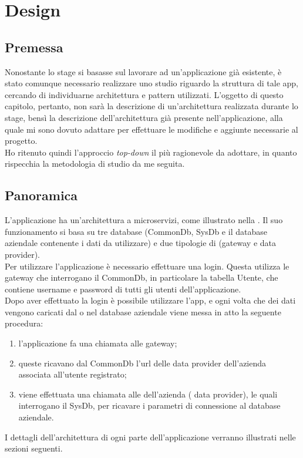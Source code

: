 \chapter{Design}
\label{cap:design}


\section{Premessa}

Nonostante lo stage si basasse sul lavorare ad un'applicazione già esistente, è stato comunque necessario realizzare uno studio riguardo la struttura di tale app, cercando di individuarne architettura e pattern utilizzati. L'oggetto di questo capitolo, pertanto, non sarà la descrizione di un'architettura realizzata durante lo stage, bensì la descrizione dell'architettura già presente nell'applicazione, alla quale mi sono dovuto adattare per effettuare le modifiche e aggiunte necessarie al progetto.\\
Ho ritenuto quindi l'approccio \emph{top-down} il più ragionevole da adottare, in quanto rispecchia la metodologia di studio da me seguita.

\section{Panoramica}

L'applicazione ha un'architettura a microservizi, come illustrato nella . Il suo funzionamento si basa su tre database (CommonDb, SysDb e il database aziendale contenente i dati da utilizzare) e due tipologie di  (gateway e data provider).\\
Per utilizzare l'applicazione è necessario effettuare una login. Questa utilizza le  gateway che interrogano il CommonDb, in particolare la tabella Utente, che contiene username e password di tutti gli utenti dell'applicazione.\\
Dopo aver effettuato la login è possibile utilizzare l'app, e ogni volta che dei dati vengono caricati dal o nel database aziendale viene messa in atto la seguente procedura:
\begin{enumerate}
    \item l'applicazione fa una chiamata alle  gateway;
    \item queste ricavano dal CommonDb l'url delle  data provider dell'azienda associata all'utente registrato;
    \item viene effettuata una chiamata alle  dell'azienda ( data provider), le quali interrogano il SysDb, per ricavare i parametri di connessione al database aziendale.
\end{enumerate}
I dettagli dell'architettura di ogni parte dell'applicazione verranno illustrati nelle sezioni seguenti.

